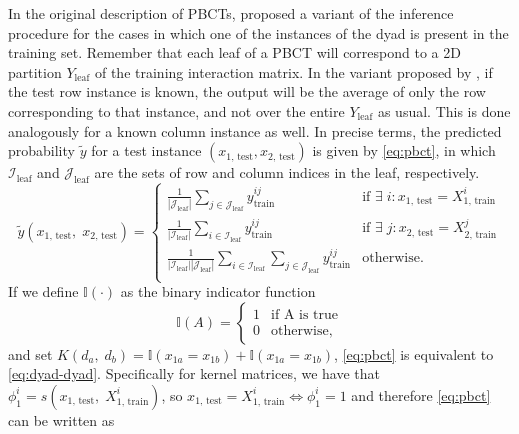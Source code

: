 \documentclass{article}
\begin{document}
In the original description of PBCTs, \cite{pliakos2018} proposed a variant of the inference procedure for the cases in which one of the instances of the dyad is present in the training set. Remember that each leaf of a PBCT will correspond to a 2D partition $Y_\text{leaf}$ of the training interaction matrix. In the variant proposed by \cite{pliakos2018}, if the test row instance is known, the output will be the average of only the row corresponding to that instance, and not over the entire $Y_\text{leaf}$ as usual. This is done analogously for a known column instance as well. In precise terms, the predicted probability $\tilde y$ for a test instance $(x_\text{1, test}, x_\text{2, test})$ is given by \autoref{eq:pbct}, in which $\mathcal{I}_\text{leaf}$ and $\mathcal{J}_\text{leaf}$ are the sets of row and column indices in the leaf, respectively.
%
\begin{equation}
    \label{eq:pbct}
    \tilde y (x_\text{1, test},\; x_\text{2, test}) = \begin{cases}
        \frac{1}{|\mathcal{J}_\text{leaf}|} \sum_{j \in \mathcal{J}_\text{leaf}} y^{ij}_\text{train} & \text{if } \exists \; i : x_\text{1, test} = X^i_\text{1, train} \\        
        \frac{1}{|\mathcal{I}_\text{leaf}|} \sum_{i \in \mathcal{I}_\text{leaf}} y^{ij}_\text{train} & \text{if } \exists\; j : x_\text{2, test} = X^j_\text{2, train} \\
        \frac{1}{|\mathcal{I}_\text{leaf}||\mathcal{J}_\text{leaf}|} \sum_{i \in \mathcal{I}_\text{leaf}}\sum_{j \in \mathcal{J}_\text{leaf}} y^{ij}_\text{train} & \text{otherwise.}\\
    \end{cases}
\end{equation}
%
If we define $\mathbb{I}(\cdot)$ as the binary indicator function
\begin{equation}
    \mathbb{I}(A) = \begin{cases}
        1 & \text{if A is true} \\
        0 & \text{otherwise},
    \end{cases}
\end{equation}
%
and set $K(d_a,\; d_b) = \mathbb{I}(x_{1a} = x_{1b}) + \mathbb{I}(x_{1a} = x_{1b})$, \ref{eq:pbct} is equivalent to \ref{eq:dyad-dyad}.
Specifically for kernel matrices, we have that $\phi_1^i = s(x_\text{1, test},\; X^i_\text{1, train})$, so $x_\text{1, test} = X^i_\text{1, train} \iff \phi_1^i = 1$ and therefore \autoref{eq:pbct} can be written as
\end{document}
